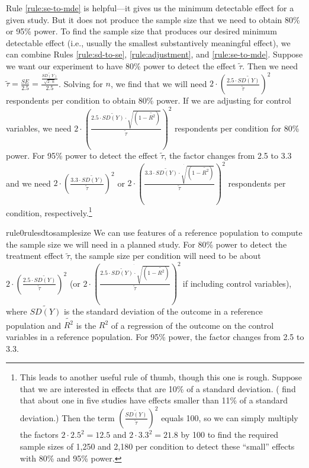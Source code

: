 \documentclass[12pt]{article}
\begin{document}
Rule \ref{rule:se-to-mde} is helpful---it gives us the minimum detectable effect for a given study.
But it does not produce the sample size that we need to obtain 80\% or 95\% power. 
To find the sample size that produces our desired minimum detectable effect (i.e., usually the smallest substantively meaningful effect), we can combine Rules \ref{rule:sd-to-se}, \ref{rule:adjustment}, and \ref{rule:se-to-mde}. 
Suppose we want our experiment to have 80\% power to detect the effect $\widetilde{\tau}$.
Then we need $\widetilde{\tau} = \frac{SE}{2.5} = \frac{\frac{\widetilde{SD(Y)}}{\sqrt{2 \cdot n}}}{2.5}$.
Solving for $n$, we find that we will need $2 \cdot \left( \frac{2.5 \cdot \widetilde{SD(Y)}}{\widetilde{\tau}} \right)^{2}$ respondents per condition to obtain 80\% power. 
If we are adjusting for control variables, we need $2 \cdot \left( \frac{\dot{2.5 \cdot \widetilde{SD(Y)} \cdot \sqrt{\left( 1 - \widetilde{R^{2}} \right)}}}{\widetilde{\tau}} \right)^{2}$ respondents per condition for 80\% power. For 95\% power to detect the effect $\widetilde{\tau}$, the factor changes from 2.5 to 3.3 and we need $2 \cdot \left( \frac{3.3 \cdot \widetilde{SD(Y)}}{\widetilde{\tau}} \right)^{2}$ or $2 \cdot \left( \frac{3.3 \cdot \dot{\widetilde{SD(Y)} \cdot \sqrt{\left( 1 - \widetilde{R^2} \right)}}}{\widetilde{\tau}} \right)^{2}$ respondents per condition, respectively.\footnote{
  This leads to another useful rule of thumb, though this one is rough. 
  Suppose that we are interested in effects that are 10\% of a standard deviation. 
  (\cite{Lovakov2021} find that about one in five studies have effects smaller than 11\% of a standard deviation.)
  Then the term $\left( \frac{\widetilde{SD(Y)}}{\widetilde{\tau}} \right)^{2}$ equals 100, so we can simply multiply the factors $2 \cdot {2.5}^{2} = 12.5$ and $2 \cdot {3.3}^{2} = 21.8$ by 100 to find the required sample sizes of 1,250 and 2,180 per condition to detect these ``small'' effects with 80\% and 95\% power.
  }

\begin{restatable}{rule0}{rulesdtosamplesize}
\label{rule:sd-to-sample-size}
We can use features of a reference population to compute the sample size we will need in a planned study. 
For 80\% power to detect the treatment effect $\widetilde{\tau}$, the sample size per condition will need to be about $2 \cdot \left( \frac{2.5 \cdot \widetilde{SD(Y)}}{\widetilde{\tau}} \right)^{2}$ (or $2 \cdot \left( \frac{\dot{2.5 \cdot \widetilde{SD(Y)} \cdot \sqrt{\left( 1 - \widetilde{R^{2}} \right)}}}{\widetilde{\tau}} \right)^{2}\ $if including control variables), where $\widetilde{SD(Y)}$ is the standard deviation of the outcome in a reference population and $\widetilde{R^2}$ is the $R^2$ of a regression of the outcome on the control variables in a reference population.
For 95\% power, the factor changes from 2.5 to 3.3.
\end{restatable}
\end{document}
